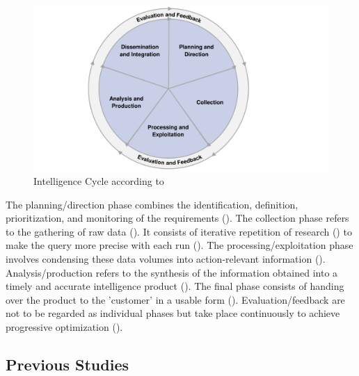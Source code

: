 \documentclass[10pt]{article}
\begin{document}
\begin{figure}[h]
    \centering
    \includegraphics[clip,width=0.6\linewidth]{PDF/images/crop_Intelligence Cycle}
    \caption{Intelligence Cycle according to \textcite{JointChiefsofStaffU.S.Army.2013}}
    \label{fig: Intelligence Cycle}
\end{figure}

The planning/direction phase combines the identification, definition, prioritization, and monitoring
of the requirements (\cite{JointChiefsofStaffU.S.Army.2013}).
The collection phase refers to the gathering of raw data (\cite{CentralIntelligenceAgency.1987}).
It consists of iterative repetition of research
(\cite{NorthAtlanticTreatyOrganization.2001}) to make the query more precise with each run
(\cite{PastorGalindo.2020}). The processing/exploitation phase involves condensing
these data volumes into action-relevant information
(\cite{JointChiefsofStaffU.S.Army.2013}).
Analysis/production refers to the synthesis of the information obtained into a timely and accurate intelligence product
(\cite{NorthAtlanticTreatyOrganization.2001}).
The final phase consists of handing over the product to the 'customer' in a
usable form (\cite{CentralIntelligenceAgency.2023, Williams.2018}).
Evaluation/feedback are not to be regarded as individual phases
but take place continuously to achieve progressive optimization
(\cite{JointChiefsofStaffU.S.Army.2013, NorthAtlanticTreatyOrganization.2001}).

\subsection{Previous Studies}
\end{document}
